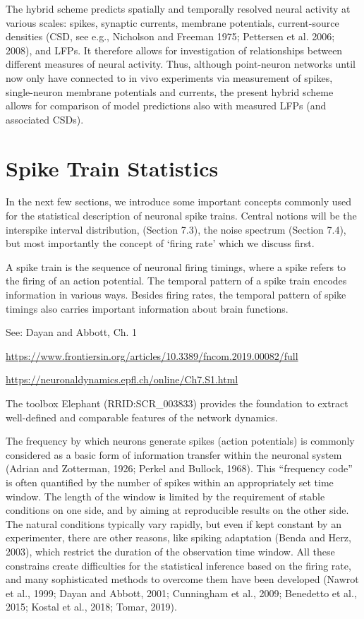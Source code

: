 The hybrid scheme predicts spatially and temporally
resolved neural activity at various scales: spikes, synaptic currents, membrane potentials, current-source densities (CSD, see
e.g., Nicholson and Freeman 1975; Pettersen et al. 2006; 2008),
and LFPs. It therefore allows for investigation of relationships
between different measures of neural activity. Thus, although
point-neuron networks until now only have connected to
in vivo experiments via measurement of spikes, single-neuron
membrane potentials and currents, the present hybrid scheme
allows for comparison of model predictions also with measured
LFPs (and associated CSDs).

\section{Spike Train Statistics}
In the next few sections, we introduce some important concepts commonly used for the statistical description of neuronal spike trains. Central notions will be the interspike interval distribution, (Section 7.3), the noise spectrum (Section 7.4), but most importantly the concept of ‘firing rate’ which we discuss first.

A spike train is the sequence of neuronal firing timings, where a spike refers to the firing of an action potential. The temporal pattern of a spike train encodes information in various ways. Besides firing rates, the temporal pattern of spike timings also carries important information about brain functions. 

See: Dayan and Abbott, Ch. 1

\url{https://www.frontiersin.org/articles/10.3389/fncom.2019.00082/full}

\url{https://neuronaldynamics.epfl.ch/online/Ch7.S1.html}

The toolbox Elephant (RRID:SCR\_003833) provides the foundation to extract well-defined and comparable features of the network dynamics. 

The frequency by which neurons generate spikes (action potentials) is commonly considered as a basic form of information transfer within the neuronal system (Adrian and Zotterman, 1926; Perkel and Bullock, 1968). This “frequency code” is often quantified by the number of spikes within an appropriately set time window. The length of the window is limited by the requirement of stable conditions on one side, and by aiming at reproducible results on the other side. The natural conditions typically vary rapidly, but even if kept constant by an experimenter, there are other reasons, like spiking adaptation (Benda and Herz, 2003), which restrict the duration of the observation time window. All these constrains create difficulties for the statistical inference based on the firing rate, and many sophisticated methods to overcome them have been developed (Nawrot et al., 1999; Dayan and Abbott, 2001; Cunningham et al., 2009; Benedetto et al., 2015; Kostal et al., 2018; Tomar, 2019).

